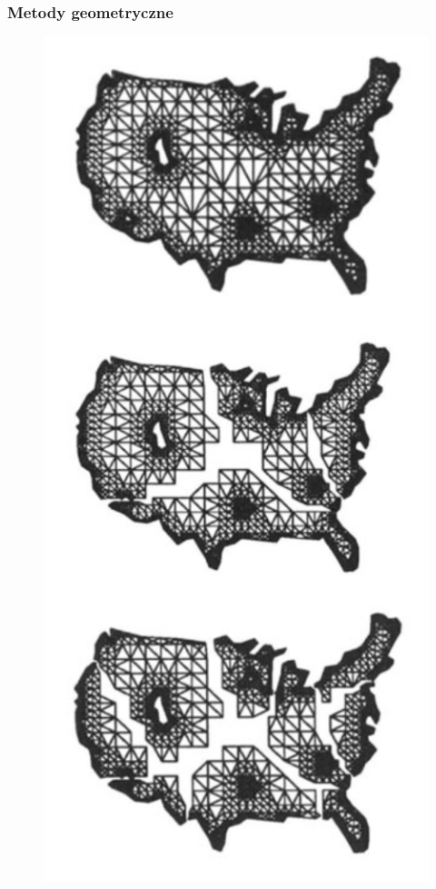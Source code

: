 \newpage

\subsubsection{Metody geometryczne}

\begin{figure}
    \vspace{-4mm}
    \includegraphics[width=\linewidth]{images/recursive-partitioning}

\end{figure}
